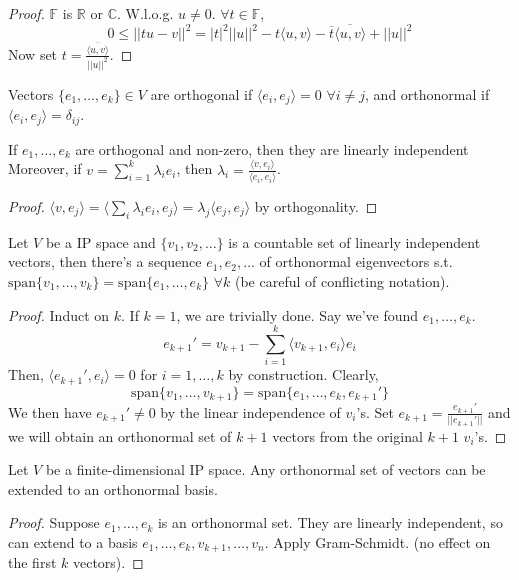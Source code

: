 \documentclass[a4paper]{article}
\begin{document}
\begin{proof}
$\mathbb{F}$ is $\mathbb{R}$ or $\mathbb{C}$. W.l.o.g. $u\neq 0$. $\forall t\in\mathbb{F}$,
$$0\leq||tu-v||^2=|t|^2||u||^2-t\langle u,v\rangle-\overline{t}\overline{\langle u,v\rangle}+||u||^2$$
Now set $t=\frac{\overline{\langle u,v\rangle}}{||u||^2}$.
\end{proof}
\begin{defi}
Vectors $\{e_1,\dots, e_k\}\in V$ are orthogonal if $\langle e_i,e_j\rangle=0$ $\forall i\neq j$, and orthonormal if $\langle e_i,e_j\rangle=\delta_{ij}$.
\end{defi}
\begin{lemma}
If $e_1,\dots,e_k$ are orthogonal and non-zero, then they are linearly independent Moreover, if $v=\sum_{i=1}^k\lambda_ie_i$, then $\lambda_i=\frac{\langle v,e_i\rangle}{\langle e_i,e_i\rangle}$.
\end{lemma}
\begin{proof}
$\langle v,e_j\rangle=\langle\sum_i\lambda_ie_i,e_j\rangle=\lambda_j\langle e_j,e_j\rangle$ by orthogonality.
\end{proof}
\begin{thm}
Let $V$ be a IP space and $\{v_1,v_2,\dots\}$ is a countable set of linearly independent vectors, then there's a sequence $e_1,e_2,\dots$ of orthonormal eigenvectors s.t. $\text{span}\{v_1,\dots,v_k\}=\text{span}\{e_1,\dots,e_k\}$ $\forall k$ (be careful of conflicting notation).
\end{thm}
\begin{proof}
Induct on $k$. If $k=1$, we are trivially done. Say we've found $e_1,\dots,e_k$.
$$e_{k+1}'=v_{k+1}-\sum_{i=1}^k\langle v_{k+1},e_i\rangle e_i$$
Then, $\langle e_{k+1}',e_i\rangle=0$ for $i=1,\dots,k$ by construction. Clearly, $$\text{span}\{v_1,\dots,v_{k+1}\}=\text{span}\{e_1,\dots,e_k,e_{k+1}'\}$$
We then have $e_{k+1}'\neq 0$ by the linear independence of $v_i$'s. Set $e_{k+1}=\frac{e_{k+1}'}{||e_{k+1}'||}$ and we will obtain an orthonormal set of $k+1$ vectors from the original $k+1$ $v_i$'s.
\end{proof}
\begin{cor}
Let $V$ be a finite-dimensional IP space. Any orthonormal set of vectors can be extended to an orthonormal basis.
\end{cor}
\begin{proof}
Suppose $e_1,\dots,e_k$ is an orthonormal set. They are linearly independent, so can extend to a basis $e_1,\dots,e_k,v_{k+1},\dots,v_n$. Apply Gram-Schmidt. (no effect on the first $k$ vectors).
\end{proof}
\end{document}
